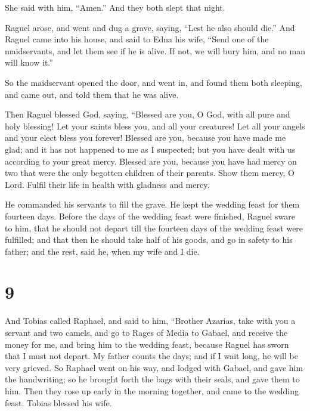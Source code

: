  She said with him, ``Amen.'' And they both slept that
night.

 Raguel arose, and went and dug a grave, 
saying, ``Lest he also should die.''  And Raguel came into
his house,  and said to Edna his wife, ``Send one of the
maidservants, and let them see if he is alive. If not, we will bury him,
and no man will know it.''

 So the maidservant opened the door, and went in, and found
them both sleeping,  and came out, and told them that he
was alive.

 Then Raguel blessed God, saying, ``Blessed are you, O God,
with all pure and holy blessing! Let your saints bless you, and all your
creatures! Let all your angels and your elect bless you forever!
 Blessed are you, because you have made me glad; and it has
not happened to me as I suspected; but you have dealt with us according
to your great mercy.  Blessed are you, because you have had
mercy on two that were the only begotten children of their parents. Show
them mercy, O Lord. Fulfil their life in health with gladness and mercy.

 He commanded his servants to fill the grave. 
He kept the wedding feast for them fourteen days.  Before
the days of the wedding feast were finished, Raguel sware to him, that
he should not depart till the fourteen days of the wedding feast were
fulfilled;  and that then he should take half of his goods,
and go in safety to his father; and the rest, said he, when my wife and
I die.

\hypertarget{section-8}{%
\section{9}\label{section-8}}

 And Tobias called Raphael, and said to him, 
``Brother Azarias, take with you a servant and two camels, and go to
Rages of Media to Gabael, and receive the money for me, and bring him to
the wedding feast,  because Raguel has sworn that I must not
depart.  My father counts the days; and if I wait long, he
will be very grieved.  So Raphael went on his way, and
lodged with Gabael, and gave him the handwriting; so he brought forth
the bags with their seals, and gave them to him.  Then they
rose up early in the morning together, and came to the wedding feast.
Tobias blessed his wife.

